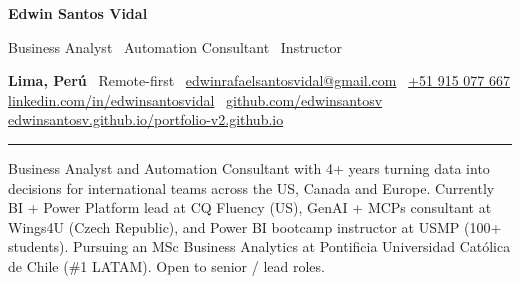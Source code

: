 \documentclass[10pt,letterpaper]{article}
\begin{document}
\pagestyle{empty}
\color{ink}

\noindent
\begin{minipage}[t]{0.58\linewidth}
  \vspace{0pt}
  {\LARGE\bfseries Edwin Santos Vidal}\par
  \vspace{1pt}
  \textcolor{inkdim}{\footnotesize Business Analyst \textperiodcentered\ Automation Consultant \textperiodcentered\ Instructor}
\end{minipage}%
\hfill
\begin{minipage}[t]{0.40\linewidth}
  \vspace{0pt}
  \raggedleft
  \textcolor{inkdim}{\footnotesize
    \textbf{\color{ink}Lima, Perú} \textperiodcentered\ Remote-first \textperiodcentered\
    \href{mailto:edwinrafaelsantosvidal@gmail.com}{edwinrafaelsantosvidal@gmail.com} \textperiodcentered\
    \href{tel:+51915077667}{+51 915 077 667} \\
    \href{https://www.linkedin.com/in/edwinsantosvidal/}{linkedin.com/in/edwinsantosvidal} \textperiodcentered\
    \href{https://github.com/edwinsantosv}{github.com/edwinsantosv} \\
    \href{https://edwinsantosv.github.io/portfolio-v2.github.io/}{edwinsantosv.github.io/portfolio-v2.github.io}
  }
\end{minipage}
\par\vspace{2pt}
\textcolor{ink}{\rule{\linewidth}{1pt}}

\vspace{3pt}
\noindent\footnotesize Business Analyst and Automation Consultant with 4+ years turning data into decisions for international teams across the US, Canada and Europe. Currently BI + Power Platform lead at CQ Fluency (US), GenAI + MCPs consultant at Wings4U (Czech Republic), and Power BI bootcamp instructor at USMP (100+ students). Pursuing an MSc Business Analytics at Pontificia Universidad Católica de Chile (\#1 LATAM). Open to senior / lead roles.

\end{document}
